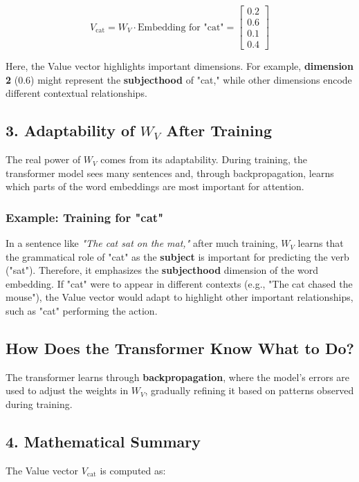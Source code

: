 \documentclass{article}
\begin{document}
\[
V_{\text{cat}} = W_V \cdot \text{Embedding for "cat"} = \begin{bmatrix} 0.2 \\ 0.6 \\ 0.1 \\ 0.4 \end{bmatrix}
\]

Here, the Value vector highlights important dimensions. For example, \textbf{dimension 2} (0.6) might represent the \textbf{subjecthood} of "cat," while other dimensions encode different contextual relationships.

\subsection*{3. Adaptability of \( W_V \) After Training}

The real power of \( W_V \) comes from its adaptability. During training, the transformer model sees many sentences and, through backpropagation, learns which parts of the word embeddings are most important for attention.

\subsubsection*{Example: Training for "cat"}
In a sentence like \textit{"The cat sat on the mat,"} after much training, \( W_V \) learns that the grammatical role of "cat" as the \textbf{subject} is important for predicting the verb ("sat"). Therefore, it emphasizes the \textbf{subjecthood} dimension of the word embedding. If "cat" were to appear in different contexts (e.g., "The cat chased the mouse"), the Value vector would adapt to highlight other important relationships, such as "cat" performing the action.

\subsection*{How Does the Transformer Know What to Do?}

The transformer learns through \textbf{backpropagation}, where the model's errors are used to adjust the weights in \( W_V \), gradually refining it based on patterns observed during training.

\subsection*{4. Mathematical Summary}
The Value vector \( V_{\text{cat}} \) is computed as:
\end{document}
